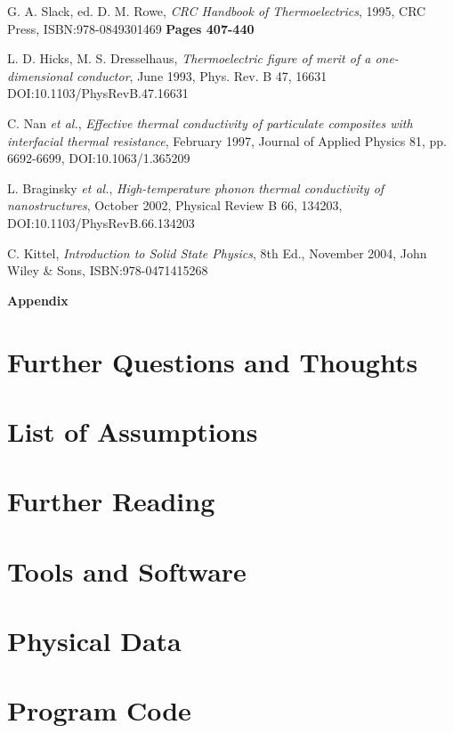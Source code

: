 \documentclass[12pt,draft]{article}
\begin{document}
\begin{thebibliography}{11}
G. A. Slack, ed. D. M. Rowe,
\emph{CRC Handbook of Thermoelectrics},
1995,
CRC Press,
ISBN:978-0849301469
\textbf{Pages 407-440}

L. D. Hicks, M. S. Dresselhaus,
\emph{Thermoelectric figure of merit of a one-dimensional conductor},
June 1993,
Phys. Rev. B 47, 16631
DOI:10.1103/PhysRevB.47.16631

C. Nan \emph{et al.},
\emph{Effective thermal conductivity of particulate composites with interfacial thermal resistance},
February 1997,
Journal of Applied Physics 81, pp. 6692-6699,
DOI:10.1063/1.365209

L. Braginsky \emph{et al.},
\emph{High-temperature phonon thermal conductivity of nanostructures},
October 2002,
Physical Review B 66, 134203,
DOI:10.1103/PhysRevB.66.134203

C. Kittel,
\emph{Introduction to Solid State Physics}, 8th Ed.,
November 2004,
John Wiley \& Sons,
ISBN:978-0471415268

\end{thebibliography}

\pagebreak

\appendix

\begin{center}
{\Huge\textbf{Appendix}}
\end{center}

\section{Further Questions and Thoughts}



\section{List of Assumptions}

\section{Further Reading}

\section{Tools and Software}

\section{Physical Data}

\section{Program Code}
\end{document}
